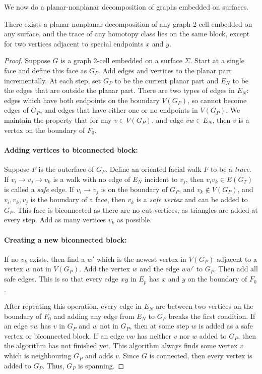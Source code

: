 We now do a planar-nonplanar decomposition of graphs embedded on surfaces.
\begin{claim}\label{claim:planar_nonplanar_decomp}
	There exists a planar-nonplanar decomposition of any graph 2-cell embedded on any surface, and the trace of any homotopy class lies on the same block, except for two vertices adjacent to special endpoints $x$ and $y$. 
\end{claim}
\begin{proof}
	Suppose \(G\) is a graph 2-cell embedded on a surface \(\Sigma\). Start at a single face and define this face as $G_P$. Add edges and vertices to the planar part incrementally. At each step, set \(G_P\) to be the current planar part and \(E_N\) to be the edges that are outside the planar part. There are two types of edges in \(E_N\): edges which have both endpoints on the boundary \(V(G_P)\), so cannot become edges of \(G_P\), and edges that have either one or no endpoints in \(V(G_P)\). We maintain the property that for any \(v \in V(G_P)\), and edge \(vw \in E_N\), then \(v\) is a vertex on the boundary of \(F_0\).
	\paragraph{Adding vertices to biconnected block:}
	Suppose $F$ is the outerface of \(G_P\). Define an oriented facial walk $F$ to be a \textit{trace}. If \(v_i \rightarrow v_j \rightarrow v_k\) is a walk with no edge of \(E_N\) incident to \(v_j\), then \(v_i v_k \in E(G_T)\) is called a \textit{safe} edge. If \(v_i \rightarrow v_j\) is on the boundary of \(G_P\), and \(v_k \notin V(G_P)\), and \(v_i,v_k,v_j\) is the boundary of a face, then \(v_k\) is a \textit{safe vertex} and can be added to \(G_P\). This face is biconnected as there are no cut-vertices, as triangles are added at every step. Add as many vertices $v_k$ as possible. 

	\paragraph{Creating a new biconnected block:}
	If no \(v_k\) exists, then find a \(w'\) which is the newest vertex in \(V(G_P)\) adjacent to a vertex \(w\) not in \(V(G_P)\). Add the vertex \(w\) and the edge \(w w'\) to \(G_P\). Then add all safe edges. This is so that every edge $xy$ in \(E_p\) has $x$ and $y$ on the boundary of $F_0$. 
	
	After repeating this operation, every edge in \(E_N\) are between two vertices on the boundary of $F_0$ and adding any edge from $E_N$ to $G_P$ breaks the first condition. If an edge \(vw\) has \(v\) in $G_P$ and $w$ not in $G_P$, then at some step \(w\) is added as a safe vertex or biconnected block. If an edge \(vw\) has neither \(v\) nor \(w\) added to \(G_P\), then the algorithm has not finished yet. This algorithm always finds some vertex $v$ which is neighbouring $G_P$ and adds $v$. Since $G$ is connected, then every vertex is added to $G_P$. Thus, $G_P$ is spanning.
	

\end{proof}
